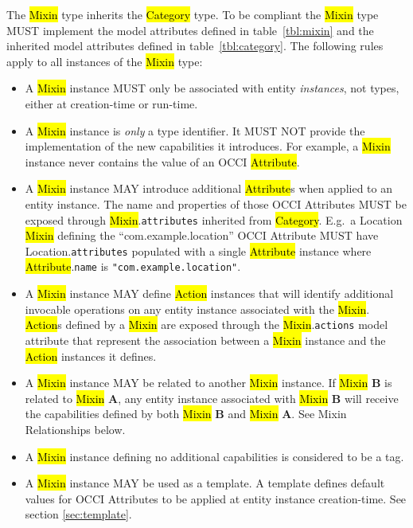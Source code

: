 \documentclass[10pt,a4paper]{article}
\begin{document}
The \hl{Mixin} type inherits the \hl{Category} type. To be compliant
the \hl{Mixin} type MUST implement the model attributes defined in
table~\ref{tbl:mixin} and the inherited model attributes defined in
table~\ref{tbl:category}. The following rules apply to all instances
of the \hl{Mixin} type:
%
\begin{itemize}
  \item A \hl{Mixin} instance MUST only be associated with entity
    {\em instances}, not types, either at creation-time or run-time.

  \item A \hl{Mixin} instance is {\em only} a type identifier. It MUST NOT
    provide the implementation of the new capabilities it introduces.
    For example, a \hl{Mixin} instance never contains the value of an OCCI
    \hl{Attribute}.

  \item A \hl{Mixin} instance MAY introduce additional \hl{Attribute}s
    when applied to an entity instance. The name and properties of those
    OCCI Attributes MUST be exposed through \hl{Mixin}.{\tt attributes}
    inherited from \hl{Category}.  E.g.~a Location
    \hl{Mixin} defining the ``com.example.location'' OCCI Attribute MUST
    have Location.{\tt attributes} populated with a single \hl{Attribute}
    instance where \hl{Attribute}.{\tt name} is {\tt "com.example.location"}.

  \item A \hl{Mixin} instance MAY define \hl{Action} instances that will
    identify additional invocable operations on any entity instance
    associated with the
    \hl{Mixin}.  \hl{Action}s defined by a \hl{Mixin} are exposed
    through the \hl{Mixin}.{\tt actions} model attribute that represent the
    association between a \hl{Mixin} instance and the \hl{Action} instances it
    defines.

  \item A \hl{Mixin} instance MAY be related to another \hl{Mixin}
    instance.  If \hl{Mixin} {\bf B} is related to \hl{Mixin} {\bf A},
    any entity instance associated with \hl{Mixin} {\bf B} will
    receive the capabilities defined by both \hl{Mixin} {\bf
      B} and \hl{Mixin} {\bf A}.  See Mixin Relationships below.

  \item A \hl{Mixin} instance defining no additional
    capabilities is considered to be a tag.

  \item A \hl{Mixin} instance MAY be used as a template. A template
    defines default values for OCCI Attributes to be applied at entity instance
    creation-time. See section \ref{sec:template}.

\end{itemize}
\end{document}
